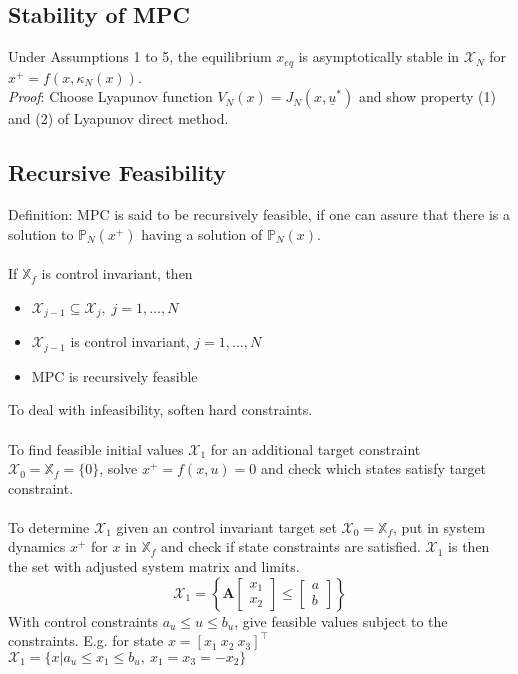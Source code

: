\documentclass[english]{latex4ei/latex4ei_sheet}
\begin{document}
\begin{sectionbox}
\subsection{Stability of MPC}
Under Assumptions 1 to 5, the equilibrium $x_{eq}$ is asymptotically stable in $\mathcal{X}_N$ for $x^{+}=f(x,\kappa_{N}(x))$.\\
\textit{Proof}: Choose Lyapunov function $V_N(x)=J_N(x,\underline{u}^{*})$ and show property (1) and (2) of Lyapunov direct method.\\

\subsection{Recursive Feasibility}
Definition: MPC is said to be recursively feasible, if one can assure that there is a solution to $\mathbb{P}_N(x^{+})$ having a solution of $\mathbb{P}_N(x)$.\\
\\
If $\mathbb{X}_f$ is control invariant, then
\begin{itemize}
    \item $\mathcal{X}_{j-1}\subseteq\mathcal{X}_{j},\;j=1,\ldots,N$
    \item $\mathcal{X}_{j-1}$ is control invariant, $j=1,\ldots,N$
    \item MPC is recursively feasible
\end{itemize}
To deal with infeasibility, soften hard constraints.\\
\\
To find feasible initial values $\mathcal{X}_1$ for an additional target constraint $\mathcal{X}_0=\mathbb{X}_f=\{0\}$, solve $x^{+}=f(x,u)=0$ and check which states satisfy target constraint.\\
\\
To determine $\mathcal{X}_1$ given an control invariant target set $\mathcal{X}_0=\mathbb{X}_f$, put in system dynamics $x^{+}$ for $x$ in $\mathbb{X}_f$ and check if state constraints are satisfied. $\mathcal{X}_1$ is then the set with adjusted system matrix and limits.
$$\mathcal{X}_1=\left\{\mathbf{A}\begin{bmatrix}x_1 \\ x_2 \end{bmatrix}\leq\begin{bmatrix}a \\ b \end{bmatrix}\right\}$$
With control constraints $a_u\leq u\leq b_u$, give feasible values subject to the constraints. E.g. for state $x=\left[x_1\ x_2\ x_3\right]^{\top}$\\ $\mathcal{X}_1=\{x| a_u \leq x_1 \leq b_u,\ x_1=x_3=-x_2\}$

\end{sectionbox}
\end{document}
